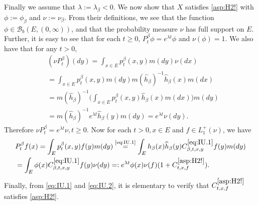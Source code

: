 \documentclass[12pt,a4paper]{amsart}
\numberwithin{equation}{section}
\theoremstyle{plain}
\theoremstyle{definition}
\theoremstyle{remark}
\begin{document}
	Finally we assume that $\lambda := \lambda_\beta < 0$. We now show that $X$ satisfies \eqref{asp:H2!} with $\phi:=\phi_\beta$ and $\nu:= \nu_\beta$.
	From their definitions, we see that the function $\phi \in \mathcal B_b(E,(0,\infty))$, and that the probability measure $\nu$ has full support on $E$.
	Further, it is easy to see that for each $t\geq 0$, $P_t^\beta \phi = e^{\lambda t}\phi$ and $\nu(\phi) = 1$.
	We also have that for any $t>0$,
\begin{align}
	&(\nu P_t^\beta)(dy) = \int_{x\in E}p_{t}^\beta(x,y)m(dy) \nu(dx)
	\\&= \int_{x\in E}p_{t}^\beta(x,y)m(dy) m(\widehat h_\beta)^{-1}\widehat h_\beta(x)m(dx)
	\\&=  m(\widehat h_\beta)^{-1}  \Big(\int_{x\in E} p_t^\beta(x,y) \widehat h_\beta(x) m(dx) \Big) m(dy)
	\\& = m(\widehat h_\beta)^{-1} e^{\lambda t}\widehat h_\beta(y) m(dy) =
	e^{\lambda t}\nu(dy).
\end{align}
	Therefore $\nu P_t^\beta = e^{\lambda t}\nu, t\geq 0$. Now for each $t>0, x \in E$ and $f\in L_1^+(\nu)$, we have
\begin{align}
	&P_t^\beta f(x) = \int_{E} p^\beta_t(x,y) f(y)m(dy)
	\overset{\text{\eqref{eq:IU.1}}}= \int_{E} h_\beta (x) \widehat h_\beta (y) C^{\eqref{eq:IU.1}}_{\beta,t,x,y} f(y) m(dy)
	\\&= \int_{E} \phi (x)  C^{\eqref{eq:IU.1}}_{\beta,t,x,y} f(y) \nu(dy)
	=: e^{\lambda t} \phi(x) \nu(f) (1+ C^{\eqref{asp:H2!}}_{t,x,f}).
\end{align}
	Finally, from \eqref{eq:IU.1} and \eqref{eq:IU.2}, it is elementary to verify that $C^{\eqref{asp:H2!}}_{t,x,f}$ satisfies \eqref{asp:H2!}.
\end{document}
